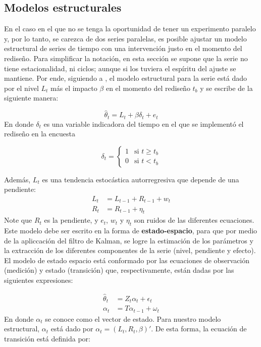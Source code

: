 \documentclass[
  12pt,
]{book}
\begin{document}
\hypertarget{modelos-estructurales}{%
\subsection{Modelos estructurales}\label{modelos-estructurales}}

En el caso en el que no se tenga la oportunidad de tener un experimento paralelo y, por lo tanto, se carezca de dos series paralelas, es posible ajustar un modelo estructural de series de tiempo con una intervención justo en el momento del rediseño. Para simplificar la notación, en esta sección se supone que la serie no tiene estacionalidad, ni ciclos; aunque si los tuviera el espíritu del ajuste se mantiene. Por ende, siguiendo a \citet{Brakel2008}, el modelo estructural para la serie está dado por el nivel \(L_t\) más el impacto \(\beta\) en el momento del rediseño \(t_b\) y se escribe de la siguiente manera:

\[
\hat \theta_{t}=L_t+\beta\delta_t+e_t
\]
En donde \(\delta_t\) es una variable indicadora del tiempo en el que se implementó el rediseño en la encuesta

\[
\delta_t =
\begin{cases}
1 & \text{si $t\geq t_b$}\\
0 & \text{si $t< t_b$}
\end{cases}
\]

Además, \(L_t\) es una tendencia estocástica autorregresiva que depende de una pendiente:
\[
\begin{aligned}
L_t & = L_{t-1}+R_{t-1}+w_t \\
R_t & = R_{t-1}+\eta_t
\end{aligned}
\]
Note que \(R_t\) es la pendiente, y \(e_t\), \(w_t\) y \(\eta_t\) son ruidos de las diferentes ecuaciones. Este modelo debe ser escrito en la forma de \textbf{estado-espacio}, para que por medio de la apliccación del filtro de Kalman, se logre la estimación de los parámetros y la extracción de los diferentes componentes de la serie (nivel, pendiente y efecto). El modelo de estado espacio está conformado por las ecuaciones de observación (medición) y estado (transición) que, respectivamente, están dadas por las siguientes expresiones:

\[
\begin{aligned}
\hat \theta_{t}&=Z_t\alpha_t+\epsilon_t\\
\alpha_t&=T\alpha_{t-1}+\omega_t
\end{aligned}
\]
En donde \(\alpha_t\) se conoce como el vector de estado. Para nuestro modelo estructural, \(\alpha_t\) está dado por \(\alpha_t=(L_t, R_t,\beta)'\). De esta forma, la ecuación de transición está definida por:
\end{document}
